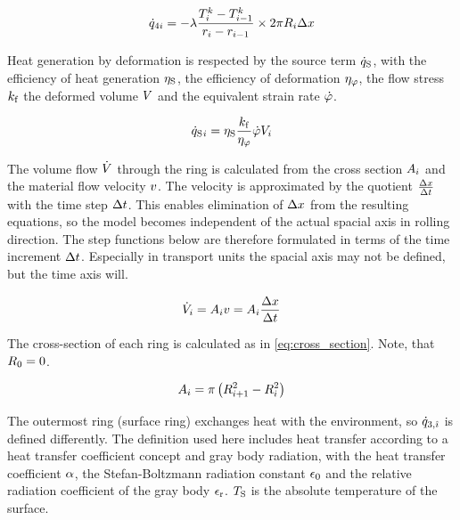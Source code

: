 \documentclass{scrartcl}
\begin{document}
    \begin{equation}
        {\dot{q}}_{4{i}} = -{\lambda} \frac{{T}_{{i}}^{{k}}-{T}_{{i}-1}^{{k}}}{{r}_{{i}} - {r}_{{i} - 1}} \times 2 \pi {R}_{{i}} {\Delta x}
        \label{eq:heat_flow_4}
    \end{equation}

    Heat generation by deformation is respected by the source term ${\dot{q}_\mathrm{S}}$, with the efficiency of heat generation ${\eta_\mathrm{S}}$, the efficiency of deformation ${\eta_\varphi}$, the flow stress ${k_\mathrm{f}}$ the deformed volume ${V}$ and the equivalent strain rate ${\dot{\varphi}}$.

    \begin{equation}
        {\dot{q}_\mathrm{S}}{}_{i} = {\eta_\mathrm{S}} \frac{{k_\mathrm{f}}}{{\eta_\varphi}} {\dot{\varphi}} {V}_{{i}}
        \label{eq:heat_source}
    \end{equation}

    The volume flow ${\dot{V}}$ through the ring is calculated from the cross section ${A}_{i}$ and the material flow velocity ${v}$.
    The velocity is approximated by the quotient $\frac{{\Delta x}}{{\Delta t}}$ with the time step ${\Delta t}$.
    This enables elimination of ${\Delta x}$ from the resulting equations, so the model becomes independent of the actual spacial axis in rolling direction.
    The step functions below are therefore formulated in terms of the time increment ${\Delta t}$.
    Especially in transport units the spacial axis may not be defined, but the time axis will.

    \begin{equation}
        {\dot{V}}_{i} = {A}_{{i}} {v} = {A}_{{i}} \frac{{\Delta x}}{{\Delta t}}
        \label{eq:volume_flow}
    \end{equation}

    \noindent The cross-section of each ring is calculated as in \autoref{eq:cross_section}.
    Note, that ${R}_0 = 0$.

    \begin{equation}
        {A}_{{i}} = \pi \left( {R}_{{i}+1}^2 -  {R}_{{i}}^2 \right)
        \label{eq:cross_section}
    \end{equation}

    The outermost ring (surface ring) exchanges heat with the environment, so ${\dot{q}}_{3,{\hat{\imath}}}$ is defined differently.
    The definition used here includes heat transfer according to a heat transfer coefficient concept and gray body radiation, with the heat transfer coefficient ${\alpha}$, the Stefan-Boltzmann radiation constant ${\epsilon_0}$ and the relative radiation coefficient of the gray body ${\epsilon_\mathrm{r}}$.
    ${T_\mathrm{S}}$ is the absolute temperature of the surface.
\end{document}
